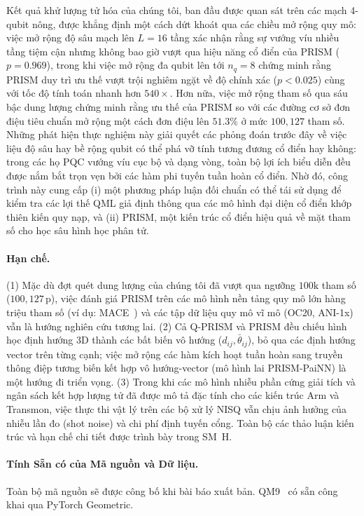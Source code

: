 \documentclass[10pt,twocolumn,letterpaper]{article}
\begin{document}
Kết quả khử lượng tử hóa của chúng tôi, ban đầu được quan sát trên các mạch 4-qubit nông, được khẳng định một cách dứt khoát qua các chiều mở rộng quy mô: việc mở rộng độ sâu mạch lên $L = 16$ tầng xác nhận rằng sự vướng víu nhiều tầng tiệm cận nhưng không bao giờ vượt qua hiệu năng cổ điển của PRISM ($p = 0.969$), trong khi việc mở rộng đa qubit lên tới $n_q = 8$ chứng minh rằng PRISM duy trì ưu thế vượt trội nghiêm ngặt về độ chính xác ($p < 0.025$) cùng với tốc độ tính toán nhanh hơn $540\times$. Hơn nữa, việc mở rộng tham số qua sáu bậc dung lượng chứng minh rằng ưu thế của PRISM so với các đường cơ sở đơn điệu tiêu chuẩn mở rộng một cách đơn điệu lên $51.3\%$ ở mức $100{,}127$ tham số. Những phát hiện thực nghiệm này giải quyết các phỏng đoán trước đây về việc liệu độ sâu hay bề rộng qubit có thể phá vỡ tính tương đương cổ điển hay không: trong các họ PQC vướng víu cục bộ và dạng vòng, toàn bộ lợi ích biểu diễn đều được nắm bắt trọn vẹn bởi các hàm phi tuyến tuần hoàn cổ điển. Nhờ đó, công trình này cung cấp (i) một phương pháp luận đối chuẩn có thể tái sử dụng để kiểm tra các lợi thế QML giả định thông qua các mô hình đại diện cổ điển khớp thiên kiến quy nạp, và (ii) PRISM, một kiến trúc cổ điển hiệu quả về mặt tham số cho học sâu hình học phân tử.

\paragraph{Hạn chế.}
(1) Mặc dù đợt quét dung lượng của chúng tôi đã vượt qua ngưỡng $100\mathrm{k}$ tham số ($100{,}127$\,p), việc đánh giá PRISM trên các mô hình nền tảng quy mô lớn hàng triệu tham số (ví dụ: MACE~\cite{batatiaMACEHigherOrder2022}) và các tập dữ liệu quy mô vĩ mô (OC20, ANI-1x) vẫn là hướng nghiên cứu tương lai. (2) Cả Q-PRISM và PRISM đều chiếu hình học định hướng 3D thành các bất biến vô hướng ($d_{ij}, \bar{\theta}_{ij}$), bỏ qua các định hướng vector trên từng cạnh; việc mở rộng các hàm kích hoạt tuần hoàn sang truyền thông điệp tương biến kết hợp vô hướng-vector (mô hình lai PRISM-PaiNN) là một hướng đi triển vọng. (3) Trong khi các mô hình nhiễu phần cứng giải tích và ngân sách kết hợp lượng tử đã được mô tả đặc tính cho các kiến trúc Arm và Transmon, việc thực thi vật lý trên các bộ xử lý NISQ vẫn chịu ảnh hưởng của nhiễu lần đo (shot noise) và chi phí định tuyến cổng. Toàn bộ các thảo luận kiến trúc và hạn chế chi tiết được trình bày trong SM~H.

\paragraph{Tính Sẵn có của Mã nguồn và Dữ liệu.}
Toàn bộ mã nguồn sẽ được công bố khi bài báo xuất bản. QM9~\cite{ramakrishnan2014quantum} có sẵn công khai qua PyTorch Geometric.
\end{document}
